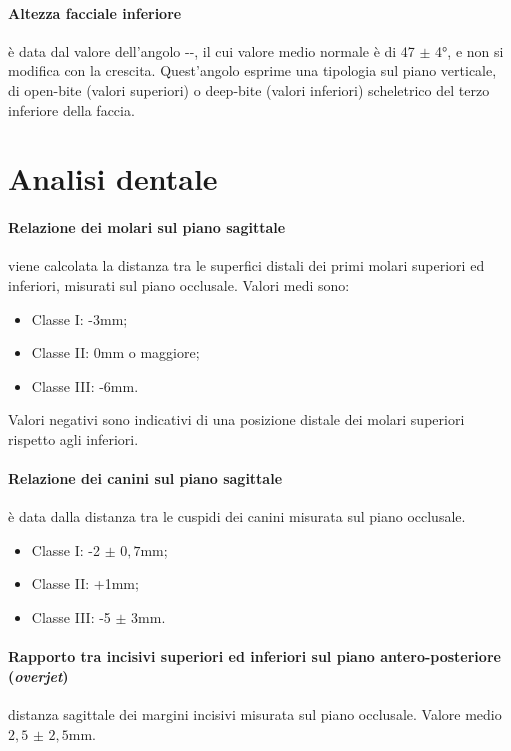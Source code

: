 \paragraph{Altezza facciale inferiore} è data dal valore dell'angolo --, il cui valore medio normale è di 47 $\pm$ 4°, e non si modifica con la crescita. Quest'angolo esprime una tipologia sul piano verticale, di open-bite (valori superiori) o deep-bite (valori inferiori) scheletrico del terzo inferiore della faccia.

\section{Analisi dentale}

\paragraph{Relazione dei molari sul piano sagittale} viene calcolata la distanza tra le superfici distali dei primi molari superiori ed inferiori, misurati sul piano occlusale. Valori medi sono:
\begin{itemize}
\item Classe I: -3mm;
\item Classe II: 0mm o maggiore;
\item Classe III: -6mm.
\end{itemize}

Valori negativi sono indicativi di una posizione distale dei molari superiori rispetto agli inferiori.

\paragraph{Relazione dei canini sul piano sagittale} è data dalla distanza tra le cuspidi dei canini misurata sul piano occlusale.
\begin{itemize}
\item Classe I: -2 $\pm$ $0,7$mm;
\item Classe II: +1mm;
\item Classe III: -5 $\pm$ 3mm.
\end{itemize}

\paragraph{Rapporto tra incisivi superiori ed inferiori sul piano antero-posteriore (\textit{overjet})} distanza sagittale dei margini incisivi misurata sul piano occlusale. Valore medio $2,5$ $\pm$ $2,5$mm.

